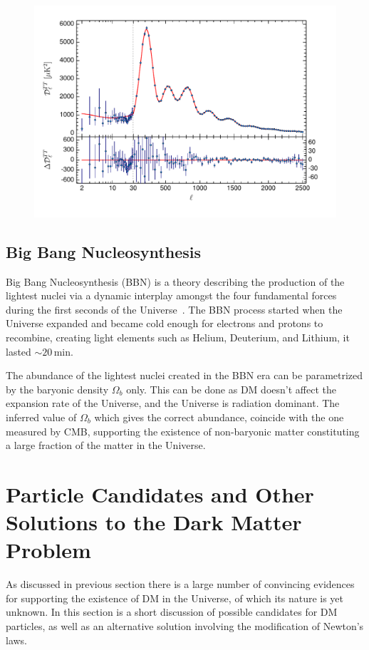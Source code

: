 \begin{figure}[]
	\centering
	\includegraphics[width=\textwidth]{figs/planck.pdf}
	\label{fig:CMB}
\end{figure}  
  
\subsection{Big Bang Nucleosynthesis}
\label{subsec:BBN}
Big Bang Nucleosynthesis (BBN) is a theory describing the production of the lightest nuclei via a dynamic interplay amongst the four fundamental forces during the first seconds of the Universe~\cite{Jedamzik:2009uy}. The BBN process started when the Universe expanded and became cold enough for electrons and protons to recombine, creating light elements such as Helium, Deuterium, and Lithium, it lasted $\sim20$\,min.

The abundance of the lightest nuclei created in the BBN era can be parametrized by the baryonic density $\Omega_b$ only. This can be done as DM doesn't affect      the expansion rate of the Universe, and the Universe is radiation dominant. The inferred value of $\Omega_b$ which gives the correct abundance, coincide with the one measured by CMB, supporting the existence of non-baryonic matter constituting a large fraction of the matter in the Universe. 
\section{Particle Candidates and Other Solutions to the Dark Matter Problem }
As discussed in previous section there is a large number of convincing evidences for supporting the existence of DM in the Universe, of which its nature is yet unknown. In this section is a short discussion of possible candidates for DM particles, as well as an alternative solution involving the modification of Newton's laws.

